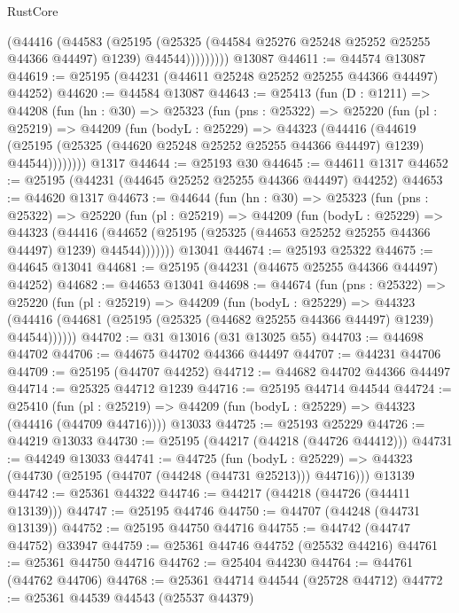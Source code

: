 \begin{lexlean}{RustCore}
\begin{coremodule}
                (@44416
                  (@44583
                    (@25195
                      (@25325 (@44584 @25276 @25248 @25252 @25255 @44366 @44497) @1239)
                      @44544)))))))))
    @13087
@44611 := @44574 @13087
@44619 := @25195 (@44231 (@44611 @25248 @25252 @25255 @44366 @44497) @44252)
@44620 := @44584 @13087
@44643 := @25413
    (fun (D : @1211) =>
    @44208
      (fun (hn : @30) =>
      @25323
        (fun (pns : @25322) =>
        @25220
          (fun (pl : @25219) =>
          @44209
            (fun (bodyL : @25229) =>
            @44323
              (@44416
                (@44619
                  (@25195 (@25325 (@44620 @25248 @25252 @25255 @44366 @44497) @1239) @44544))))))))
    @1317
@44644 := @25193 @30
@44645 := @44611 @1317
@44652 := @25195 (@44231 (@44645 @25252 @25255 @44366 @44497) @44252)
@44653 := @44620 @1317
@44673 := @44644
    (fun (hn : @30) =>
    @25323
      (fun (pns : @25322) =>
      @25220
        (fun (pl : @25219) =>
        @44209
          (fun (bodyL : @25229) =>
          @44323
            (@44416
              (@44652 (@25195 (@25325 (@44653 @25252 @25255 @44366 @44497) @1239) @44544)))))))
    @13041
@44674 := @25193 @25322
@44675 := @44645 @13041
@44681 := @25195 (@44231 (@44675 @25255 @44366 @44497) @44252)
@44682 := @44653 @13041
@44698 := @44674
    (fun (pns : @25322) =>
    @25220
      (fun (pl : @25219) =>
      @44209
        (fun (bodyL : @25229) =>
        @44323 (@44416 (@44681 (@25195 (@25325 (@44682 @25255 @44366 @44497) @1239) @44544))))))
@44702 := @31 @13016 (@31 @13025 @55)
@44703 := @44698 @44702
@44706 := @44675 @44702 @44366 @44497
@44707 := @44231 @44706
@44709 := @25195 (@44707 @44252)
@44712 := @44682 @44702 @44366 @44497
@44714 := @25325 @44712 @1239
@44716 := @25195 @44714 @44544
@44724 := @25410
    (fun (pl : @25219) => @44209 (fun (bodyL : @25229) => @44323 (@44416 (@44709 @44716))))
    @13033
@44725 := @25193 @25229
@44726 := @44219 @13033
@44730 := @25195 (@44217 (@44218 (@44726 @44412)))
@44731 := @44249 @13033
@44741 := @44725
    (fun (bodyL : @25229) => @44323 (@44730 (@25195 (@44707 (@44248 (@44731 @25213))) @44716)))
    @13139
@44742 := @25361 @44322
@44746 := @44217 (@44218 (@44726 (@44411 @13139)))
@44747 := @25195 @44746
@44750 := @44707 (@44248 (@44731 @13139))
@44752 := @25195 @44750 @44716
@44755 := @44742 (@44747 @44752) @33947
@44759 := @25361 @44746 @44752 (@25532 @44216)
@44761 := @25361 @44750 @44716
@44762 := @25404 @44230
@44764 := @44761 (@44762 @44706)
@44768 := @25361 @44714 @44544 (@25728 @44712)
@44772 := @25361 @44539 @44543 (@25537 @44379)

\end{coremodule}
\end{lexlean}
